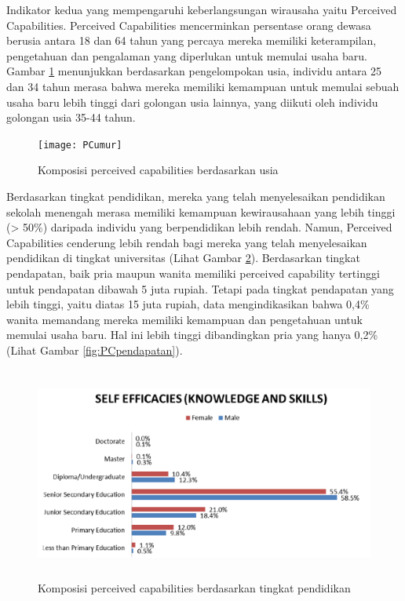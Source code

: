 Indikator kedua yang mempengaruhi keberlangsungan wirausaha yaitu Perceived Capabilities. Perceived Capabilities mencerminkan persentase orang dewasa berusia antara 18 dan 64 tahun yang percaya mereka memiliki keterampilan, pengetahuan dan pengalaman yang diperlukan untuk memulai usaha baru. Gambar \ref{fig:PCumur} menunjukkan berdasarkan pengelompokan usia, individu antara 25 dan 34 tahun merasa bahwa mereka memiliki kemampuan untuk memulai sebuah usaha baru lebih tinggi dari golongan usia lainnya, yang diikuti oleh individu golongan usia 35-44 tahun.

\begin{figure} [ht]
	\centering  
	\texttt{[image: PCumur]} 
	\caption[Komposisi perceived capabilities berdasarkan usia]{Komposisi perceived capabilities berdasarkan usia} 
	\label{fig:PCumur} 
\end{figure}

Berdasarkan tingkat pendidikan, mereka yang telah menyelesaikan pendidikan sekolah menengah merasa memiliki kemampuan kewirausahaan yang lebih tinggi (> 50\%) daripada individu yang berpendidikan lebih rendah. Namun, Perceived Capabilities cenderung lebih rendah bagi mereka yang telah menyelesaikan pendidikan di tingkat universitas (Lihat Gambar \ref{fig:PCpendidikan}). Berdasarkan tingkat pendapatan, baik pria maupun wanita memiliki perceived capability tertinggi untuk pendapatan dibawah 5 juta rupiah. Tetapi pada tingkat pendapatan yang lebih tinggi, yaitu diatas 15 juta rupiah, data mengindikasikan bahwa 0,4\% wanita memandang mereka memiliki kemampuan dan pengetahuan untuk memulai usaha baru. Hal ini lebih tinggi dibandingkan pria yang hanya 0,2\% (Lihat Gambar \ref{fig:PCpendapatan}). 

\begin{figure} [H]
	\centering  
	\includegraphics[width=14cm, height=7cm]{PCpendidikan} 
	\caption[Komposisi perceived capabilities berdasarkan tingkat pendidikan]{Komposisi perceived capabilities berdasarkan tingkat pendidikan} 
	\label{fig:PCpendidikan} 
\end{figure}
 


